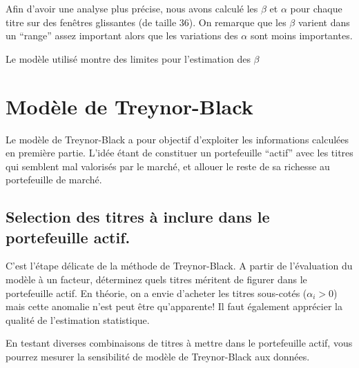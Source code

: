 \documentclass[
]{article}
\newenvironment{Shaded}{\begin{snugshade}}{\end{snugshade}}
\newcommand{\ControlFlowTok}[1]{\textcolor[rgb]{0.13,0.29,0.53}{\textbf{#1}}}
\newcommand{\FunctionTok}[1]{\textcolor[rgb]{0.00,0.00,0.00}{#1}}
\newcommand{\NormalTok}[1]{#1}
\newcommand{\OtherTok}[1]{\textcolor[rgb]{0.56,0.35,0.01}{#1}}
\newcommand{\SpecialCharTok}[1]{\textcolor[rgb]{0.00,0.00,0.00}{#1}}
\newcommand{\StringTok}[1]{\textcolor[rgb]{0.31,0.60,0.02}{#1}}
\begin{document}
Afin d'avoir une analyse plus précise, nous avons calculé les \(\beta\)
et \(\alpha\) pour chaque titre sur des fenêtres glissantes (de taille
36). On remarque que les \(\beta\) varient dans un ``range'' assez
important alors que les variations des \(\alpha\) sont moins
importantes.

Le modèle utilisé montre des limites pour l'estimation des \(\beta\)

\hypertarget{moduxe8le-de-treynor-black}{%
\section{Modèle de Treynor-Black}\label{moduxe8le-de-treynor-black}}

Le modèle de Treynor-Black a pour objectif d'exploiter les informations
calculées en première partie. L'idée étant de constituer un portefeuille
``actif'' avec les titres qui semblent mal valorisés par le marché, et
allouer le reste de sa richesse au portefeuille de marché.

\hypertarget{selection-des-titres-uxe0-inclure-dans-le-portefeuille-actif.}{%
\subsection{Selection des titres à inclure dans le portefeuille
actif.}\label{selection-des-titres-uxe0-inclure-dans-le-portefeuille-actif.}}

C'est l'étape délicate de la méthode de Treynor-Black. A partir de
l'évaluation du modèle à un facteur, déterminez quels titres méritent de
figurer dans le portefeuille actif. En théorie, on a envie d'acheter les
titres sous-cotés (\(\alpha_i > 0\)) mais cette anomalie n'est peut être
qu'apparente! Il faut également apprécier la qualité de l'estimation
statistique.

En testant diverses combinaisons de titres à mettre dans le portefeuille
actif, vous pourrez mesurer la sensibilité de modèle de Treynor-Black
aux données.

\begin{Shaded}
\end{Shaded}
\end{document}

